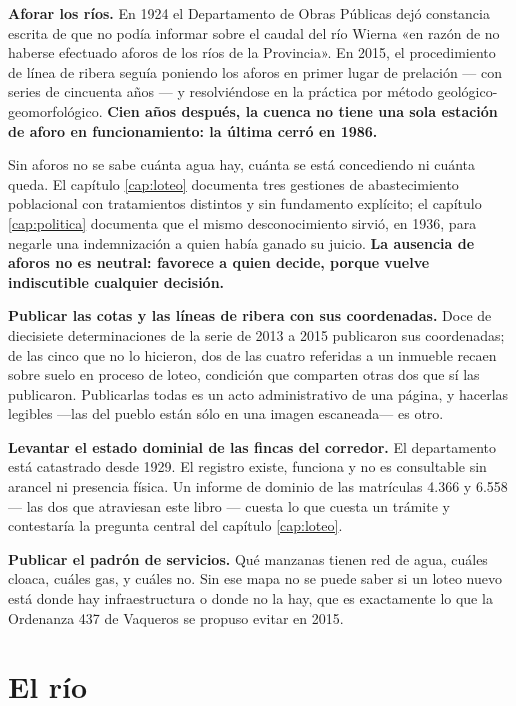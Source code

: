 \textbf{Aforar los ríos.} En 1924 el Departamento de Obras Públicas dejó constancia escrita
de que no podía informar sobre el caudal del río Wierna «en razón de no haberse efectuado
aforos de los ríos de la Provincia». En 2015, el procedimiento de línea de ribera seguía
poniendo los aforos en primer lugar de prelación --- con series de cincuenta años --- y
resolviéndose en la práctica por método geológico-geomorfológico. \textbf{Cien años después, la cuenca no tiene una sola estación de aforo en funcionamiento: la última cerró en 1986.}

Sin aforos no se sabe cuánta agua hay, cuánta se está concediendo ni cuánta queda. El
capítulo \ref{cap:loteo} documenta tres gestiones de abastecimiento poblacional con tratamientos distintos
y sin fundamento explícito; el capítulo \ref{cap:politica} documenta que el mismo desconocimiento sirvió, en
1936, para negarle una indemnización a quien había ganado su juicio. \textbf{La ausencia de
aforos no es neutral: favorece a quien decide, porque vuelve indiscutible cualquier decisión.}

\textbf{Publicar las cotas y las líneas de ribera con sus coordenadas.} Doce de diecisiete determinaciones de la serie de 2013 a 2015 publicaron sus coordenadas; de las cinco que no lo hicieron, dos de las cuatro referidas a un inmueble recaen sobre suelo en proceso de loteo, condición que comparten otras dos que sí las publicaron. Publicarlas todas es un acto administrativo de una página, y hacerlas legibles ---las del pueblo están sólo en una imagen escaneada--- es otro.

\textbf{Levantar el estado dominial de las fincas del corredor.} El departamento está
catastrado desde 1929. El registro existe, funciona y no es consultable sin arancel ni
presencia física. Un informe de dominio de las matrículas 4.366 y 6.558 --- las dos que
atraviesan este libro --- cuesta lo que cuesta un trámite y contestaría la pregunta central
del capítulo \ref{cap:loteo}.

\textbf{Publicar el padrón de servicios.} Qué manzanas tienen red de agua, cuáles cloaca,
cuáles gas, y cuáles no. Sin ese mapa no se puede saber si un loteo nuevo está donde hay
infraestructura o donde no la hay, que es exactamente lo que la Ordenanza 437 de Vaqueros se
propuso evitar en 2015.

\section{El río}

